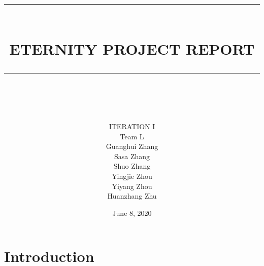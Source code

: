 \documentclass[12pt]{article}
\newcommand{\HRule}[1]{\rule{\linewidth}{#1}}
\begin{document}
\title{ \normalsize \textsc{}
		\\ [2.0cm]
		\HRule{0.5pt} \\
		\LARGE \textbf{\uppercase{Eternity Project Report}}
		\HRule{2pt} \\ [0.5cm]
		\normalsize  \vspace*{5\baselineskip}}


\date{June 8, 2020}

\author{
        \vspace{1.5cm}
       \LARGE ITERATION I \\
        \vspace{0.5cm}
        \LARGE Team L\\


		Guanghui Zhang\\
        Sasa Zhang\\
        Shuo Zhang\\
        Yingjie Zhou\\
        Yiyang Zhou\\
        Huanzhang Zhu\\
 }

\maketitle


\newpage

\tableofcontents
\newpage

\section{Introduction}
\end{document}
